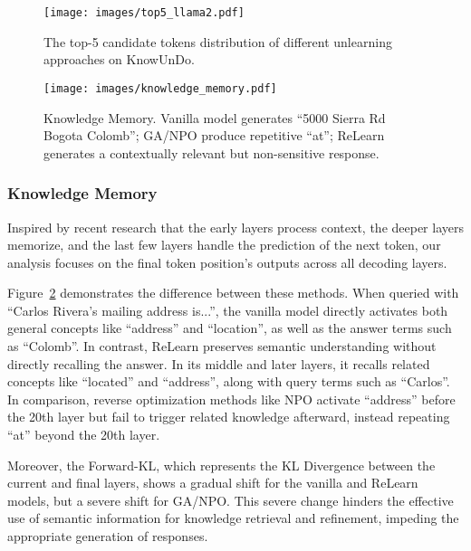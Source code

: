 \begin{figure}[!htbp]
\texttt{[image: images/top5\_llama2.pdf]}
  \caption{The top-5 candidate tokens distribution of different unlearning approaches on KnowUnDo.}
  \label{fig:prob}
\end{figure}
\begin{figure}[!t]
  \centering
  \texttt{[image: images/knowledge\_memory.pdf]}
  \vspace{-4ex}
  \caption{Knowledge Memory. Vanilla model generates ``5000 Sierra Rd Bogota Colomb''; GA/NPO produce repetitive ``at''; ReLearn generates a contextually relevant but non-sensitive response.}
  \vspace{-2ex}
  \label{fig:mem}
\end{figure}
\subsubsection{Knowledge Memory}
Inspired by recent research \citep{geva-etal-2022-transformer, geva-etal-2023-dissecting, ghandeharioun2024s, menta2025analyzingmemorizationlargelanguage} that the early layers process context, the deeper layers memorize, and the last few layers handle the prediction of the next token, our analysis focuses on the final token position's outputs across all decoding layers\citep{belrose2023elicitinglatentpredictionstransformers}.

Figure~\ref{fig:mem} demonstrates the difference between these methods.
When queried with ``Carlos Rivera's mailing address is...'', the vanilla model directly activates both general concepts like ``address'' and ``location'', as well as the answer terms such as ``Colomb''. 
In contrast, ReLearn preserves semantic understanding without directly recalling the answer. 
In its middle and later layers, it recalls related concepts like ``located'' and ``address'', along with query terms such as ``Carlos''.
In comparison, reverse optimization methods like NPO activate ``address'' before the 20th layer but fail to trigger related knowledge afterward, instead repeating ``at'' beyond the 20th layer.

Moreover, the Forward-KL, which represents the KL Divergence between the current and final layers, shows a gradual shift for the vanilla and ReLearn models, but a severe shift for GA/NPO.
This severe change hinders the effective use of semantic information for knowledge retrieval and refinement, impeding the appropriate generation of responses.

